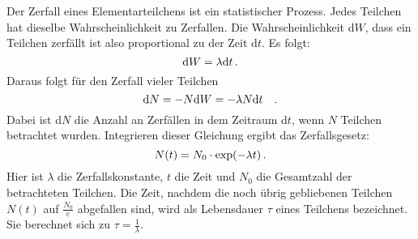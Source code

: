         Der Zerfall eines Elementarteilchens ist ein statistischer Prozess. Jedes Teilchen hat dieselbe Wahrscheinlichkeit zu Zerfallen.
        Die Wahrscheinlichkeit d$W$, dass ein Teilchen zerfällt ist also proportional zu der Zeit d$t$. Es folgt:
        \begin{equation*}
            \text{d}W = \lambda\text{d}t \, .
        \end{equation*}
        Daraus folgt für den Zerfall vieler Teilchen
        \begin{equation*}
            \text{d}N = -N\text{d}W = -\lambda N \text{d}t \quad .
        \end{equation*}
       Dabei ist d$N$ die Anzahl an Zerfällen in dem Zeitraum d$t$, wenn $N$ Teilchen betrachtet wurden.
       Integrieren dieser Gleichung ergibt das Zerfallsgesetz:
       \begin{equation*}
           N(t) = N_0 \cdot \text{exp}(-\lambda t)\, .
       \end{equation*}
       Hier ist $\lambda$ die Zerfallskonstante, $t$ die Zeit und $N_0$ die Gesamtzahl der betrachteten Teilchen. 
       Die Zeit, nachdem die noch übrig gebliebenen Teilchen $N(t)$ auf $\frac{N_0}{e}$ abgefallen sind, 
       wird als Lebensdauer $\tau$ eines Teilchens bezeichnet. Sie berechnet sich zu $\tau = \frac{1}{\lambda}$.





